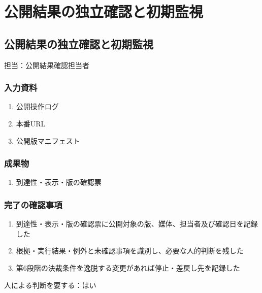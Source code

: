 \documentclass[a4paper,11pt]{article}
\begin{document}
\section{公開結果の独立確認と初期監視}
\subsection{公開結果の独立確認と初期監視}
\par 担当：公開結果確認担当者\par\medskip
\subsubsection*{入力資料}
\begin{enumerate}[leftmargin=2em,itemsep=0.35em]
\item 公開操作ログ
\item 本番URL
\item 公開版マニフェスト
\end{enumerate}
\subsubsection*{成果物}
\begin{enumerate}[leftmargin=2em,itemsep=0.35em]
\item 到達性・表示・版の確認票
\end{enumerate}
\subsubsection*{完了の確認事項}
\begin{enumerate}[leftmargin=2em,itemsep=0.35em]
\item 到達性・表示・版の確認票に公開対象の版、媒体、担当者及び確認日を記録した
\item 根拠・実行結果・例外と未確認事項を識別し、必要な人的判断を残した
\item 第6段階の決裁条件を逸脱する変更があれば停止・差戻し先を記録した
\end{enumerate}
\par 人による判断を要する：はい\par\medskip
\end{document}
